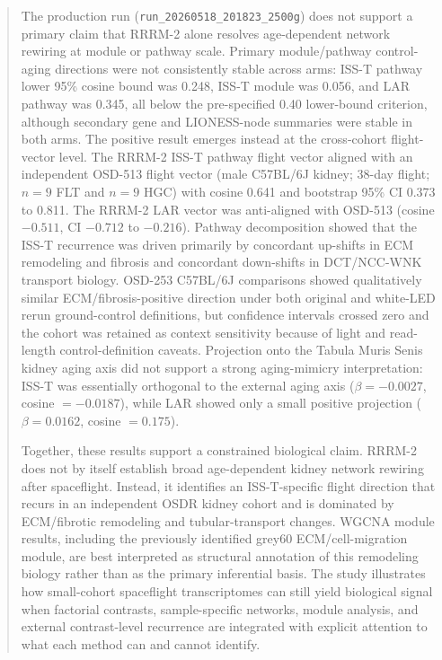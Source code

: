 \documentclass[11pt]{article}
\newcommand{\code}[1]{\texttt{#1}}
\begin{document}
\begin{abstract}
The production run (\code{run\_20260518\_201823\_2500g}) does not support a primary claim that RRRM-2 alone resolves age-dependent network rewiring at module or pathway scale. Primary module/pathway control-aging directions were not consistently stable across arms: ISS-T pathway lower 95\% cosine bound was 0.248, ISS-T module was 0.056, and LAR pathway was 0.345, all below the pre-specified 0.40 lower-bound criterion, although secondary gene and LIONESS-node summaries were stable in both arms. The positive result emerges instead at the cross-cohort flight-vector level. The RRRM-2 ISS-T pathway flight vector aligned with an independent OSD-513 flight vector (male C57BL/6J kidney; 38-day flight; $n=9$ FLT and $n=9$ HGC) with cosine 0.641 and bootstrap 95\% CI 0.373 to 0.811. The RRRM-2 LAR vector was anti-aligned with OSD-513 (cosine $-0.511$, CI $-0.712$ to $-0.216$). Pathway decomposition showed that the ISS-T recurrence was driven primarily by concordant up-shifts in ECM remodeling and fibrosis and concordant down-shifts in DCT/NCC-WNK transport biology. OSD-253 C57BL/6J comparisons showed qualitatively similar ECM/fibrosis-positive direction under both original and white-LED rerun ground-control definitions, but confidence intervals crossed zero and the cohort was retained as context sensitivity because of light and read-length control-definition caveats. Projection onto the Tabula Muris Senis kidney aging axis did not support a strong aging-mimicry interpretation: ISS-T was essentially orthogonal to the external aging axis ($\beta=-0.0027$, cosine $=-0.0187$), while LAR showed only a small positive projection ($\beta=0.0162$, cosine $=0.175$).

Together, these results support a constrained biological claim. RRRM-2 does not by itself establish broad age-dependent kidney network rewiring after spaceflight. Instead, it identifies an ISS-T-specific flight direction that recurs in an independent OSDR kidney cohort and is dominated by ECM/fibrotic remodeling and tubular-transport changes. WGCNA module results, including the previously identified grey60 ECM/cell-migration module, are best interpreted as structural annotation of this remodeling biology rather than as the primary inferential basis. The study illustrates how small-cohort spaceflight transcriptomes can still yield biological signal when factorial contrasts, sample-specific networks, module analysis, and external contrast-level recurrence are integrated with explicit attention to what each method can and cannot identify.
\end{abstract}
\end{document}
